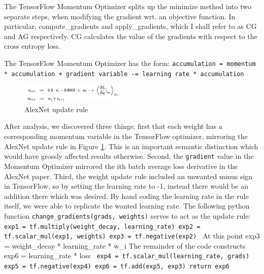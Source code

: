 \documentclass[conference]{IEEEtran}
\begin{document}
The TensorFlow Momentum Optimizer splits up the minimize method into two separate steps, when modifying the gradient wrt. an objective function. In particular, compute\_gradients and apply\_gradients, which I shall refer to as CG and AG respectively. CG calculates the value of the gradients with respect to the cross entropy loss.

The TensorFlow Momentum Optimizer has the form:
\newline
\newline
\footnotesize
\texttt{accumulation = momentum * accumulation + gradient \newline
variable -= learning rate * accumulation}
\normalsize

\begin{figure}[ht]
    \centering
    \includegraphics[width=0.45\textwidth]{AlexNet.png}
    \caption{AlexNet update rule}
    \label{fig:alexnet}
\end{figure}

After analysis, we discovered three things; first that each weight has a corresponding momentum variable in the TensorFlow optimizer, mirroring the AlexNet update rule in Figure \ref{fig:alexnet}. This is an important semantic distinction which would have grossly affected results otherwise. Second, the \texttt{gradient} value in the Momentum Optimizer mirrored the ith batch average loss derivative in the AlexNet paper. Third, the weight update rule included an unwanted minus sign in TensorFlow, so by setting the learning rate to -1, instead there would be an addition there which was desired. By hand coding the learning rate in the rule itself, we were able to replicate the wanted learning rate. The following python function \texttt{change\_gradients(grads, weights)} serves to act as the update rule:
\newline
\newline
\texttt{exp1 = tf.multiply(weight\_decay, learning\_rate) \newline
    exp2 = tf.scalar\_mul(exp1, weights) \newline
    exp3 = tf.negative(exp2) \newline
    }
    \newline
    At this point exp3 = weight\_decay * learning\_rate * w\_i
    \newline
    The remainder of the code constructs exp6 = learning\_rate * loss
    \newline
    \newline
\texttt{
    exp4 = tf.scalar\_mul(learning\_rate, grads) \newline
    exp5 = tf.negative(exp4) \newline
    exp6 = tf.add(exp5, exp3) \newline
    return exp6 \newline
}
\end{document}
